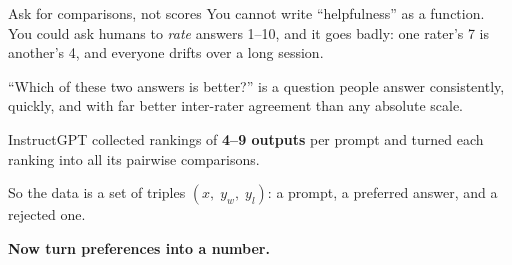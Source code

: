 \documentclass[aspectratio=169]{beamer}
\begin{document}
\begin{frame}{Ask for comparisons, not scores}
  \small
  You cannot write ``helpfulness'' as a function. You could ask humans to \emph{rate} answers
  1--10, and it goes badly: one rater's 7 is another's 4, and everyone drifts over a long
  session.

  \vskip 8pt
  \begin{tcolorbox}[colback=paramgreen!8, colframe=paramgreen, boxrule=0.7pt, arc=2pt,
                    title={\textbf{Comparisons are much easier}}]
    \small
    ``Which of these two answers is better?'' is a question people answer consistently, quickly,
    and with far better inter-rater agreement than any absolute scale.

    \vskip 4pt
    InstructGPT collected rankings of \textbf{4--9 outputs} per prompt and turned each ranking
    into all its pairwise comparisons.
  \end{tcolorbox}

  \vskip 8pt
  \begin{center}
    \small
    So the data is a set of triples $(x,\; y_w,\; y_l)$: a prompt, a preferred answer, and a
    rejected one.

    \vskip 4pt
    \textbf{Now turn preferences into a number.}
  \end{center}
\end{frame}
\end{document}
